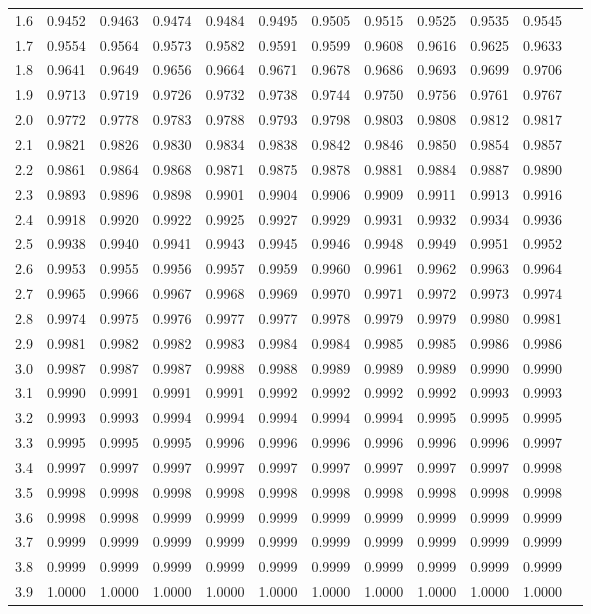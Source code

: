 {\begin{center}
\begin{tabular}{rr@{\ }r@{\ }r@{\ }r@{\ }r@{\ }r@{\ }r@{\ }r@{\ }r@{\ }r@{\ }r}
1.6&0.9452&0.9463&0.9474&0.9484&0.9495&0.9505&0.9515&0.9525&0.9535&0.9545\\
1.7&0.9554&0.9564&0.9573&0.9582&0.9591&0.9599&0.9608&0.9616&0.9625&0.9633\\
1.8&0.9641&0.9649&0.9656&0.9664&0.9671&0.9678&0.9686&0.9693&0.9699&0.9706\\
1.9&0.9713&0.9719&0.9726&0.9732&0.9738&0.9744&0.9750&0.9756&0.9761&0.9767\\
2.0&0.9772&0.9778&0.9783&0.9788&0.9793&0.9798&0.9803&0.9808&0.9812&0.9817\\
2.1&0.9821&0.9826&0.9830&0.9834&0.9838&0.9842&0.9846&0.9850&0.9854&0.9857\\
2.2&0.9861&0.9864&0.9868&0.9871&0.9875&0.9878&0.9881&0.9884&0.9887&0.9890\\
2.3&0.9893&0.9896&0.9898&0.9901&0.9904&0.9906&0.9909&0.9911&0.9913&0.9916\\
2.4&0.9918&0.9920&0.9922&0.9925&0.9927&0.9929&0.9931&0.9932&0.9934&0.9936\\
2.5&0.9938&0.9940&0.9941&0.9943&0.9945&0.9946&0.9948&0.9949&0.9951&0.9952\\
2.6&0.9953&0.9955&0.9956&0.9957&0.9959&0.9960&0.9961&0.9962&0.9963&0.9964\\
2.7&0.9965&0.9966&0.9967&0.9968&0.9969&0.9970&0.9971&0.9972&0.9973&0.9974\\
2.8&0.9974&0.9975&0.9976&0.9977&0.9977&0.9978&0.9979&0.9979&0.9980&0.9981\\
2.9&0.9981&0.9982&0.9982&0.9983&0.9984&0.9984&0.9985&0.9985&0.9986&0.9986\\
3.0&0.9987&0.9987&0.9987&0.9988&0.9988&0.9989&0.9989&0.9989&0.9990&0.9990\\
3.1&0.9990&0.9991&0.9991&0.9991&0.9992&0.9992&0.9992&0.9992&0.9993&0.9993\\
3.2&0.9993&0.9993&0.9994&0.9994&0.9994&0.9994&0.9994&0.9995&0.9995&0.9995\\
3.3&0.9995&0.9995&0.9995&0.9996&0.9996&0.9996&0.9996&0.9996&0.9996&0.9997\\
3.4&0.9997&0.9997&0.9997&0.9997&0.9997&0.9997&0.9997&0.9997&0.9997&0.9998\\
3.5&0.9998&0.9998&0.9998&0.9998&0.9998&0.9998&0.9998&0.9998&0.9998&0.9998\\
3.6&0.9998&0.9998&0.9999&0.9999&0.9999&0.9999&0.9999&0.9999&0.9999&0.9999\\
3.7&0.9999&0.9999&0.9999&0.9999&0.9999&0.9999&0.9999&0.9999&0.9999&0.9999\\
3.8&0.9999&0.9999&0.9999&0.9999&0.9999&0.9999&0.9999&0.9999&0.9999&0.9999\\
3.9&1.0000&1.0000&1.0000&1.0000&1.0000&1.0000&1.0000&1.0000&1.0000&1.0000\\


\end{tabular}
\end{center}}
